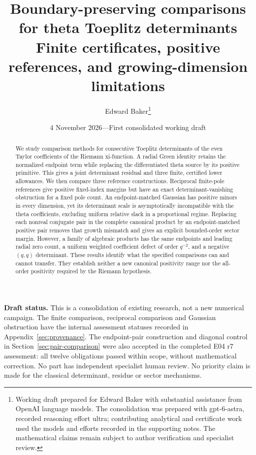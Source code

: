 \documentclass[11pt]{article}
\title{Boundary-preserving comparisons for theta Toeplitz determinants\\
\large Finite certificates, positive references, and growing-dimension limitations}
\author{Edward Baker\thanks{Working draft prepared for Edward Baker with substantial assistance from OpenAI language models. The consolidation was prepared with gpt-6-astra, recorded reasoning effort ultra; contributing analytical and certificate work used the models and efforts recorded in the supporting notes. The mathematical claims remain subject to author verification and specialist review.}}
\date{4 November 2026\quad---\quad First consolidated working draft}
\theoremstyle{remark}
\begin{document}
\maketitle
\begin{abstract}
We study comparison methods for consecutive Toeplitz determinants of the
even Taylor coefficients of the Riemann xi-function. A radial Green identity
retains the normalized endpoint term while replacing the differentiated
theta source by its positive primitive. This gives a joint determinant
residual and three finite, certified lower allowances. We then compare
three reference constructions. Reciprocal finite-pole references give
positive fixed-index margins but have an exact determinant-vanishing obstruction for a fixed pole count.
An endpoint-matched Gaussian has positive minors in every dimension, yet
its determinant scale is asymptotically incompatible with the theta
coefficients, excluding uniform relative slack in a proportional regime.
Replacing each nonreal conjugate pair in the complete canonical product
by an endpoint-matched positive pair removes that growth mismatch and
gives an explicit bounded-order sector margin. However, a family of
algebraic products has the same endpoints and leading radial zero count,
a uniform weighted coefficient defect of order $q^{-2}$, and a negative
$(q,q)$ determinant. These results identify what the specified comparisons
can and cannot transfer. They establish neither a new canonical positivity
range nor the all-order positivity required by the Riemann hypothesis.
\end{abstract}

\noindent\textbf{Draft status.}
This is a consolidation of existing research, not a new numerical campaign.
The finite comparison, reciprocal comparison and Gaussian obstruction have
the internal assessment statuses recorded in Appendix~\ref{sec:provenance}.
The endpoint-pair construction and diagonal control in
Section~\ref{sec:pair-comparison} were also accepted in the completed
E04 r7 assessment: all twelve obligations passed within scope, without
mathematical correction.
No part has independent specialist human review. No priority claim is made
for the classical determinant, residue or sector mechanisms.

\clearpage
\tableofcontents
\clearpage
\end{document}
